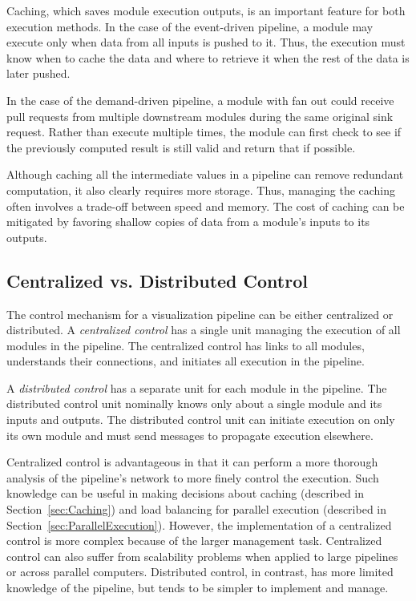 \documentclass[journal,onecolumn,12pt,letterpaper,twoside]{IEEEtran}
\newcommand*{\keyterm}[1]{\emph{#1}}
\begin{document}
Caching, which saves module execution outputs, is an important feature
for both execution methods.  In the case of the event-driven pipeline, a
module may execute only when data from all inputs is pushed to it.
Thus, the execution must know when to cache the data and where to retrieve
it when the rest of the data is later pushed.

In the case of the demand-driven pipeline, a module with fan out could
receive pull requests from multiple downstream modules during the same
original sink request.  Rather than execute multiple times, the module
can first check to see if the previously computed result is still valid and
return that if possible.

Although caching all the intermediate values in a pipeline can remove
redundant computation, it also clearly requires more storage.  Thus,
managing the caching often involves a trade-off between speed and memory.
The cost of caching can be mitigated by favoring shallow copies of data
from a module's inputs to its outputs.

\subsection{Centralized vs. Distributed Control}
\label{sec:CentralizedDistributed}

The control mechanism for a visualization pipeline can be either
centralized or distributed.  A \keyterm{centralized control} has a single
unit managing the execution of all modules in the pipeline.  The
centralized control has links to all modules, understands their
connections, and initiates all execution in the pipeline.

A \keyterm{distributed control} has a separate unit for each module in
the pipeline.  The distributed control unit nominally knows only about a
single module and its inputs and outputs.  The distributed control unit
can initiate execution on only its own module and must send messages to
propagate execution elsewhere.

Centralized control is advantageous in that it can perform a more thorough
analysis of the pipeline's network to more finely control the execution.
Such knowledge can be useful in making decisions about caching (described
in Section~\ref{sec:Caching}) and load balancing for parallel execution
(described in Section~\ref{sec:ParallelExecution}).  However, the
implementation of a centralized control is more complex because of the
larger management task.  Centralized control can also suffer from
scalability problems when applied to large pipelines or across parallel
computers.  Distributed control, in contrast, has more limited knowledge of
the pipeline, but tends to be simpler to implement and manage.
\end{document}
